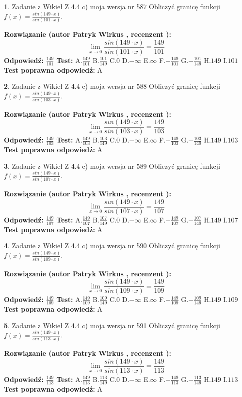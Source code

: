 \documentclass[12pt, a4paper]{article}
\theoremstyle{definition} %
\newtheorem{zad}{}
\newcommand{\zadStart}[1]{\begin{zad}#1\newline}
\newcommand{\zadStop}{\end{zad}}
\newcommand{\rozwStart}[2]{\noindent \textbf{Rozwiązanie (autor #1 , recenzent #2): }\newline}
\newcommand{\rozwStop}{\newline}
\newcommand{\odpStart}{\noindent \textbf{Odpowiedź:}\newline}
\newcommand{\odpStop}{\newline}
\newcommand{\testStart}{\noindent \textbf{Test:}\newline}
\newcommand{\testStop}{\newline}
\newcommand{\kluczStart}{\noindent \textbf{Test poprawna odpowiedź:}\newline}
\newcommand{\kluczStop}{\newline}
\begin{document}
\zadStart{Zadanie z Wikieł Z 4.4 c) moja wersja nr 587}
Obliczyć granicę funkcji $f(x)=\frac{sin(149\cdot x)}{sin(101\cdot x)}$.
\zadStop
\rozwStart{Patryk Wirkus}{}
$$\lim\limits_{x\to 0}\frac{sin(149\cdot x)}{sin(101\cdot x)}=
\frac{149}{101}$$
\rozwStop
\odpStart
$\frac{149}{101}$
\odpStop
\testStart
A.$\frac{149}{101}$
B.$\frac{101}{149}$
C.$0$
D.$-\infty$
E.$\infty$
F.$-\frac{149}{101}$
G.$-\frac{101}{149}$
H.$149$
I.$101$
\testStop
\kluczStart
A
\kluczStop



\zadStart{Zadanie z Wikieł Z 4.4 c) moja wersja nr 588}
Obliczyć granicę funkcji $f(x)=\frac{sin(149\cdot x)}{sin(103\cdot x)}$.
\zadStop
\rozwStart{Patryk Wirkus}{}
$$\lim\limits_{x\to 0}\frac{sin(149\cdot x)}{sin(103\cdot x)}=
\frac{149}{103}$$
\rozwStop
\odpStart
$\frac{149}{103}$
\odpStop
\testStart
A.$\frac{149}{103}$
B.$\frac{103}{149}$
C.$0$
D.$-\infty$
E.$\infty$
F.$-\frac{149}{103}$
G.$-\frac{103}{149}$
H.$149$
I.$103$
\testStop
\kluczStart
A
\kluczStop



\zadStart{Zadanie z Wikieł Z 4.4 c) moja wersja nr 589}
Obliczyć granicę funkcji $f(x)=\frac{sin(149\cdot x)}{sin(107\cdot x)}$.
\zadStop
\rozwStart{Patryk Wirkus}{}
$$\lim\limits_{x\to 0}\frac{sin(149\cdot x)}{sin(107\cdot x)}=
\frac{149}{107}$$
\rozwStop
\odpStart
$\frac{149}{107}$
\odpStop
\testStart
A.$\frac{149}{107}$
B.$\frac{107}{149}$
C.$0$
D.$-\infty$
E.$\infty$
F.$-\frac{149}{107}$
G.$-\frac{107}{149}$
H.$149$
I.$107$
\testStop
\kluczStart
A
\kluczStop



\zadStart{Zadanie z Wikieł Z 4.4 c) moja wersja nr 590}
Obliczyć granicę funkcji $f(x)=\frac{sin(149\cdot x)}{sin(109\cdot x)}$.
\zadStop
\rozwStart{Patryk Wirkus}{}
$$\lim\limits_{x\to 0}\frac{sin(149\cdot x)}{sin(109\cdot x)}=
\frac{149}{109}$$
\rozwStop
\odpStart
$\frac{149}{109}$
\odpStop
\testStart
A.$\frac{149}{109}$
B.$\frac{109}{149}$
C.$0$
D.$-\infty$
E.$\infty$
F.$-\frac{149}{109}$
G.$-\frac{109}{149}$
H.$149$
I.$109$
\testStop
\kluczStart
A
\kluczStop



\zadStart{Zadanie z Wikieł Z 4.4 c) moja wersja nr 591}
Obliczyć granicę funkcji $f(x)=\frac{sin(149\cdot x)}{sin(113\cdot x)}$.
\zadStop
\rozwStart{Patryk Wirkus}{}
$$\lim\limits_{x\to 0}\frac{sin(149\cdot x)}{sin(113\cdot x)}=
\frac{149}{113}$$
\rozwStop
\odpStart
$\frac{149}{113}$
\odpStop
\testStart
A.$\frac{149}{113}$
B.$\frac{113}{149}$
C.$0$
D.$-\infty$
E.$\infty$
F.$-\frac{149}{113}$
G.$-\frac{113}{149}$
H.$149$
I.$113$
\testStop
\kluczStart
A
\kluczStop
\end{document}
